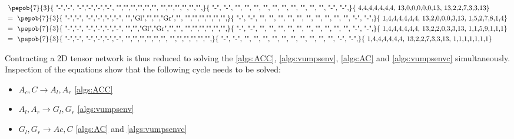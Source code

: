 \begin{equation}
  \begin{split}
    & \vcenter{ \hbox{ \pepob{7}{3}{{
              "-","-", "-","-","-","-",
              "","","","","","",
              "","","","","","",}}{{
              "-", "-",
              "", "",
              "", "",
              "", "",
              "", "",
              "", "",
              "-", "-",}}{{
              4,4,4,4,4,4,4,
              13,0,0,0,0,0,13,
              13,2,2,7,3,3,13}} }}\\
    &=       \vcenter{ \hbox{ \pepob{7}{3}{{
              "-","-", "-","-","-","-",
              "","Gl","","","Gr","",
              "","","","","","",}}{{
              "-", "-",
              "", "",
              "", "",
              "", "",
              "", "",
              "", "",
              "-", "-",}}{{
              1,4,4,4,4,4,4,
              13,2,0,0,0,3,13,
              1,5,2,7,8,1,4}}}} \\
    &=  \vcenter{ \hbox{ \pepob{7}{3}{{
              "-","-", "-","-","-","-",
              "","","Gl","Gr","","",
              "","","","","","",}}{{
              "-", "-",
              "", "",
              "", "",
              "", "",
              "", "",
              "", "",
              "-", "-",}}{{
              1,4,4,4,4,4,4,
              13,2,2,0,3,3,13,
              1,1,5,9,1,1,1}} }}\\
    &= \vcenter{ \hbox{ \pepob{7}{3}{{
              "-","-", "-","-","-","-",
              "","","","","","",
              "","","","","","",}}{{
              "-", "-",
              "", "",
              "", "",
              "", "",
              "", "",
              "", "",
              "-", "-",}}{{
              1,4,4,4,4,4,4,
              13,2,2,7,3,3,13,
              1,1,1,1,1,1,1}} }}
  \end{split}
\end{equation}


Contracting a 2D tensor network is thus reduced to solving the  \cref{algs:ACC}, \cref{algs:vumpsenv}, \cref{algs:AC} and \cref{algs:vumpsenvc} simultaneously. Inspection of the equations show that the following cycle needs to be solved:

\begin{itemize}
  \item  $A_c,C  \rightarrow A_l,A_r  $  \cref{algs:ACC}
  \item  $A_l,A_r  \rightarrow G_l,G_r  $ \cref{algs:vumpsenv}
  \item  $ G_l,G_r   \rightarrow Ac,C $ \cref{algs:AC} and  \cref{algs:vumpsenvc}
\end{itemize}

